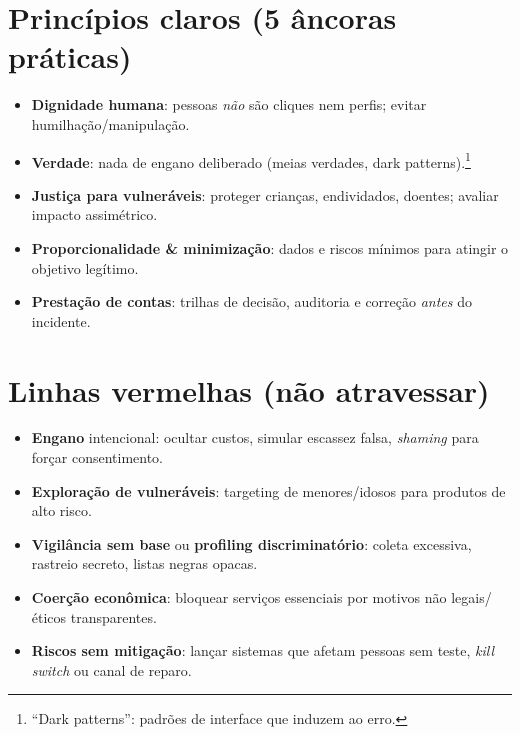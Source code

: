 \section{Princípios claros (5 âncoras práticas)}
\begin{itemize}[leftmargin=*,noitemsep]
  \item \textbf{Dignidade humana}: pessoas \emph{não} são cliques nem perfis; evitar humilhação/manipulação.
  \item \textbf{Verdade}: nada de engano deliberado (meias verdades, dark patterns).\footnote{``Dark patterns'': padrões de interface que induzem ao erro.}
  \item \textbf{Justiça para vulneráveis}: proteger crianças, endividados, doentes; avaliar impacto assimétrico.
  \item \textbf{Proporcionalidade \& minimização}: dados e riscos mínimos para atingir o objetivo legítimo.
  \item \textbf{Prestação de contas}: trilhas de decisão, auditoria e correção \emph{antes} do incidente.
\end{itemize}

\section{Linhas vermelhas (não atravessar)}
\begin{checklist}[title={Exemplos concretos}]
\begin{itemize}[leftmargin=*,noitemsep]
  \item \textbf{Engano} intencional: ocultar custos, simular escassez falsa, \emph{shaming} para forçar consentimento.
  \item \textbf{Exploração de vulneráveis}: targeting de menores/idosos para produtos de alto risco.
  \item \textbf{Vigilância sem base} ou \textbf{profiling discriminatório}: coleta excessiva, rastreio secreto, listas negras opacas.
  \item \textbf{Coerção econômica}: bloquear serviços essenciais por motivos não legais/éticos transparentes.
  \item \textbf{Riscos sem mitigação}: lançar sistemas que afetam pessoas sem teste, \emph{kill switch} ou canal de reparo.
\end{itemize}
\end{checklist}

